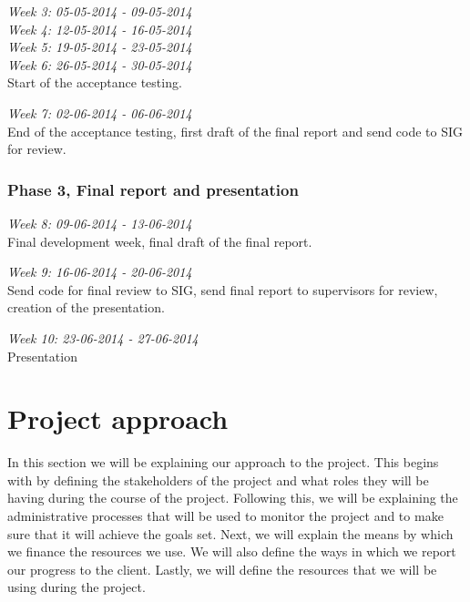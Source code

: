 \documentclass[]{article}
\begin{document}
\noindent\emph{Week 3: 05-05-2014 - 09-05-2014}\\

\noindent\emph{Week 4: 12-05-2014 - 16-05-2014}\\

\noindent\emph{Week 5: 19-05-2014 - 23-05-2014}\\

\noindent\emph{Week 6: 26-05-2014 - 30-05-2014}\\
Start of the acceptance testing.

\noindent\emph{Week 7: 02-06-2014 - 06-06-2014}\\
End of the acceptance testing, first draft of the final report and send code to SIG for review.

\subsubsection{Phase 3, Final report and presentation}

\noindent\emph{Week 8: 09-06-2014 - 13-06-2014}\\
Final development week, final draft of the final report.

\noindent\emph{Week 9: 16-06-2014 - 20-06-2014}\\
Send code for final review to SIG, send final report to supervisors for review, creation of the presentation.

\noindent\emph{Week 10: 23-06-2014 - 27-06-2014}\\
Presentation
\section{Project approach}
In this section we will be explaining our approach to the project.
This begins with by defining the stakeholders of the project and what roles they will be having during the course of the project.
Following this, we will be explaining the administrative processes that will be used to monitor the project and to make sure that it will achieve the goals set.
Next, we will explain the means by which we finance the resources we use.
We will also define the ways in which we report our progress to the client.
Lastly, we will define the resources that we will be using during the project.
\end{document}
